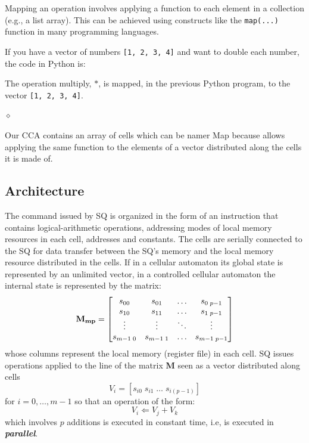 Mapping an operation involves applying a function to each element in a collection (e.g., a list array). This can be achieved using constructs like the {\tt map(...)} function in many programming languages.
\begin{exemplu}
If you have a vector of numbers {\tt [1, 2, 3, 4]} and want to double each number, the code in Python is:
{\em 
{}
}

The operation multiply, $*$, is mapped, in the previous Python program, to the vector {\tt [1, 2, 3, 4]}.

$\diamond$
\end{exemplu}
Our CCA contains an array of cells which can be namer Map because allows applying the same  function to the elements of a vector distributed along the cells  it is made of.

\subsection{Architecture}

The command issued by SQ is organized in the form of an instruction that contains logical-arithmetic operations, addressing modes of local memory resources in each cell, addresses and constants. The cells are serially connected to the SQ for data transfer between the SQ's memory and the local memory resource distributed in the cells. If in a cellular automaton its global state is represented by an unlimited  vector, in a controlled cellular automaton the internal state is represented by the matrix:
\[
{\bf M_{mp}} = \begin{bmatrix}
    s_{00} & s_{01} & \dots  & s_{0 \; p-1}\\
    s_{10} & s_{11} & \dots  & s_{1 \; p-1}\\
    \vdots & \vdots & \ddots & \vdots\\
    s_{m-1 \; 0} & s_{m-1 \; 1} & \dots  & s_{m-1 \; p-1}
    \end{bmatrix}
\]
whose columns represent the local memory (register file) in each cell. SQ issues operations applied to the line of the matrix {\bf M} seen as a vector distributed along cells
$$V_i = [s_{i0} \; s_{i1} \; \ldots \; s_{i(p-1)}]$$ for $i = 0, \ldots, m-1$ so that an operation of the form:
$$V_i \Leftarrow V_j + V_k$$
which involves $p$ additions is executed in constant time, i.e, is executed in {\bf {\em parallel}}.

